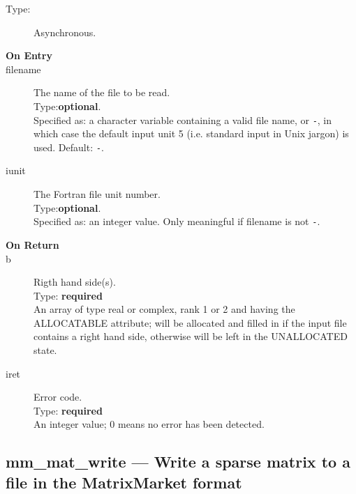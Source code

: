 \begin{description}
\item[Type:] Asynchronous.
\item[\bf  On Entry ]
\item[filename] The name of the file to be read.\\
Type:{\bf optional}.\\
Specified as: a character variable containing a valid file name, or
\verb|-|, in which case the default input unit  5 (i.e. standard input
in Unix jargon) is used. Default: \verb|-|. 
\item[iunit] The Fortran file unit number.\\
Type:{\bf optional}.\\
Specified as: an integer value. Only meaningful if filename is not \verb|-|.
\end{description}

\begin{description}
\item[\bf On Return]
\item[b] Rigth hand side(s).\\
Type: {\bf required} \\
An  array of type real or complex, rank 1 or 2 and having the ALLOCATABLE
attribute; will be allocated and filled in if the input file contains
a right hand side, otherwise will be left in the UNALLOCATED state. 
\item[iret] Error code.\\
Type: {\bf required} \\
An integer value; 0 means no error has been detected. 
\end{description}



\clearpage\subsection*{mm\_mat\_write --- Write a sparse matrix to a
  file in the MatrixMarket format}


